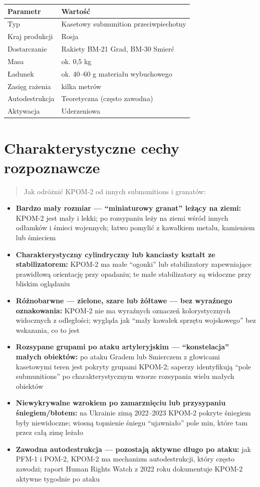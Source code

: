 \documentclass[12pt,openany,oneside]{book}
\providecommand{\tightlist}{%
  \setlength{\itemsep}{0pt}\setlength{\parskip}{0pt}}
\begin{document}
\begin{longtable}[]{@{}ll@{}}
\toprule\noalign{}
Parametr & Wartość \\
\midrule\noalign{}
\endhead
\bottomrule\noalign{}
\endlastfoot
Typ & Kasetowy submunition przeciwpiechotny \\
Kraj produkcji & Rosja \\
Dostarczanie & Rakiety BM-21 Grad, BM-30 Smierć \\
Masa & ok. 0,5 kg \\
Ładunek & ok. 40--60 g materiału wybuchowego \\
Zasięg rażenia & kilka metrów \\
Autodestrukcja & Teoretyczna (często zawodna) \\
Aktywacja & Uderzeniowa \\
\end{longtable}

\section{Charakterystyczne cechy
rozpoznawcze}\label{charakterystyczne-cechy-rozpoznawcze-117}

\begin{quote}
Jak odróżnić KPOM-2 od innych submunitions i granatów:
\end{quote}

\begin{itemize}
\tightlist
\item
  \textbf{Bardzo mały rozmiar --- ``miniaturowy granat'' leżący na
  ziemi:} KPOM-2 jest mały i lekki; po rozsypaniu leży na ziemi wśród
  innych odłamków i śmieci wojennych; łatwo pomylić z kawałkiem metalu,
  kamieniem lub śmieciem
\item
  \textbf{Charakterystyczny cylindryczny lub kanciasty kształt ze
  stabilizatorem:} KPOM-2 ma małe ``ogonki'' lub stabilizatory
  zapewniające prawidłową orientację przy opadaniu; te małe
  stabilizatory są widoczne przy bliskim oglądaniu
\item
  \textbf{Różnobarwne --- zielone, szare lub żółtawe --- bez wyraźnego
  oznakowania:} KPOM-2 nie ma wyraźnych oznaczeń kolorystycznych
  widocznych z odległości; wygląda jak ``mały kawałek sprzętu
  wojskowego'' bez wskazania, co to jest
\item
  \textbf{Rozsypane grupami po ataku artyleryjskim --- ``konstelacja''
  małych obiektów:} po ataku Gradem lub Smierczem z głowicami kasetowymi
  teren jest pokryty grupami KPOM-2; saperzy identyfikują ``pole
  submunitions'' po charakterystycznym wzorze rozsypania wielu małych
  obiektów
\item
  \textbf{Niewykrywalne wzrokiem po zamarznięciu lub przysypaniu
  śniegiem/błotem:} na Ukrainie zimą 2022--2023 KPOM-2 pokryte śniegiem
  były niewidoczne; wiosną topnienie śniegu ``ujawniało'' pole min,
  które tam przez całą zimę leżało
\item
  \textbf{Zawodna autodestrukcja --- pozostają aktywne długo po ataku:}
  jak PFM-1 i POM-2, KPOM-2 ma mechanizm autodestrukcji, który często
  zawodzi; raport Human Rights Watch z 2022 roku dokumentuje KPOM-2
  aktywne tygodnie po ataku
\end{itemize}
\end{document}
